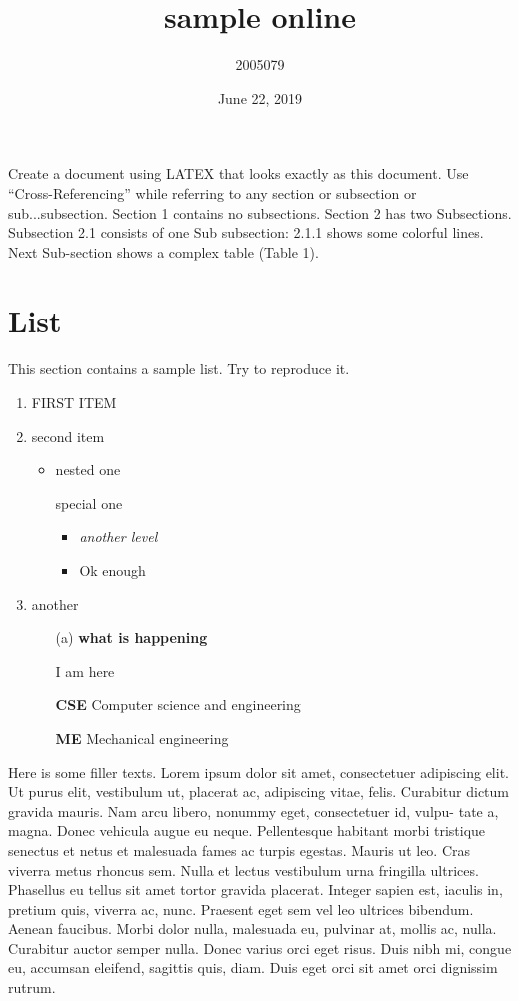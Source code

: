 \documentclass{article}
\title{sample online}
\author{2005079}
\date{June 22, 2019}
\begin{document}
\maketitle
\par 
Create a document using LATEX that looks exactly as this document. Use “Cross-Referencing” while referring to any section or subsection or sub...subsection. Section 1 contains no subsections. Section 2 has two Subsections. Subsection 2.1 consists of one Sub subsection: 2.1.1 shows some colorful lines. Next Sub-section shows a complex table (Table 1).
\section{List}
This section contains a sample list. Try to reproduce it.
\begin{enumerate}
    \item \large FIRST ITEM
    \item second item
    \begin{itemize}
        \item nested one
        \item[] special one
        \begin{itemize}
            \item \textit{another level}
            \item Ok enough
        \end{itemize}
    \end{itemize}
    \item another 
    \begin{enumerate}
        \item[(a)] \textbf{what is happening}
        \item[] I am here 
        \item[] \textbf{CSE} Computer science and engineering 
        \item[] \textbf{ME} Mechanical engineering 
    \end{enumerate}
\end{enumerate}
\par Here is some filler texts. Lorem ipsum dolor sit amet, consectetuer adipiscing elit. Ut purus elit, vestibulum ut, placerat ac, adipiscing vitae, felis. Curabitur dictum gravida mauris. Nam arcu libero, nonummy eget, consectetuer id, vulpu- tate a, magna. Donec vehicula augue eu neque. Pellentesque habitant morbi tristique senectus et netus et malesuada fames ac turpis egestas. Mauris ut leo. Cras viverra metus rhoncus sem. Nulla et lectus vestibulum urna fringilla ultrices. Phasellus eu tellus sit amet tortor gravida placerat. Integer sapien est, iaculis in, pretium quis, viverra ac, nunc. Praesent eget sem vel leo ultrices bibendum. Aenean faucibus. Morbi dolor nulla, malesuada eu, pulvinar at, mollis ac, nulla. Curabitur auctor semper nulla. Donec varius orci eget risus. Duis nibh mi, congue eu, accumsan eleifend, sagittis quis, diam. Duis eget orci sit amet orci dignissim rutrum.
\end{document}
